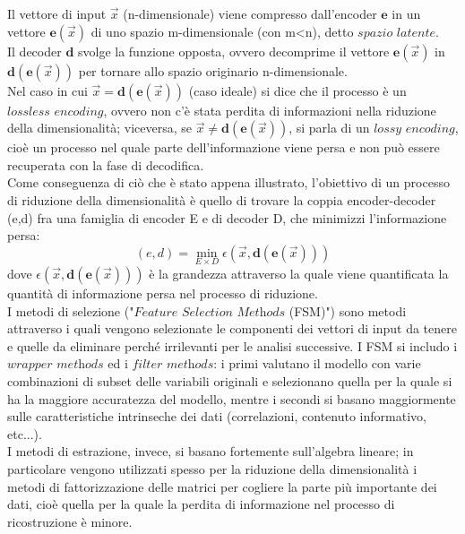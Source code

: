 Il vettore di input $\vec{x}$ (n-dimensionale) viene compresso dall'encoder $\textbf{e}$ in un vettore $\textbf{e}(\vec{x})$ di uno spazio m-dimensionale (con m<n), detto $\textit{spazio latente}$. \\
Il decoder $\textbf{d}$ svolge la funzione opposta, ovvero decomprime il vettore $\textbf{e}(\vec{x})$ in $\textbf{d}(\textbf{e}(\vec{x}))$ per tornare allo spazio originario n-dimensionale. \\
Nel caso in cui $\vec{x} = \textbf{d}(\textbf{e}(\vec{x}))$ (caso ideale) si dice che il processo è un $\textit{lossless encoding}$, ovvero non c'è stata perdita di informazioni nella riduzione della dimensionalità; viceversa, se $\vec{x} \not= \textbf{d}(\textbf{e}(\vec{x}))$, si parla di un $\textit{lossy encoding}$, cioè un processo nel quale parte dell'informazione viene persa e non può essere recuperata con la fase di decodifica. \\
\newpage
Come conseguenza di ciò che è stato appena illustrato, l'obiettivo di un processo di riduzione della dimensionalità è quello di trovare la coppia encoder-decoder (e,d) fra una famiglia di encoder E e di decoder D, che minimizzi l'informazione persa:
\begin{equation}
(e,d) = \min_{E \times D} \epsilon (\vec{x},\textbf{d}(\textbf{e}(\vec{x})))
\end{equation}
dove $\epsilon (\vec{x},\textbf{d}(\textbf{e}(\vec{x})))$ è la grandezza attraverso la quale viene  quantificata la quantità di informazione persa nel processo di riduzione. \\
I metodi di selezione ("$\textit{Feature Selection Methods}$ (FSM)") sono metodi attraverso i quali vengono selezionate le componenti dei vettori di input da tenere e quelle da eliminare perché irrilevanti per le analisi successive. I FSM si includo i $\textit{wrapper methods}$ ed i $\textit{filter methods}$: i primi valutano il modello con varie combinazioni di subset delle variabili originali e selezionano quella per la quale si ha la maggiore accuratezza del modello, mentre i secondi si basano maggiormente sulle caratteristiche intrinseche dei dati (correlazioni, contenuto informativo, etc...). \\
I metodi di estrazione, invece, si basano fortemente sull'algebra lineare; in particolare vengono utilizzati spesso per la riduzione della dimensionalità i metodi di fattorizzazione delle matrici per cogliere la parte più importante dei dati, cioè quella per la quale la perdita di informazione nel processo di ricostruzione è minore. \\
